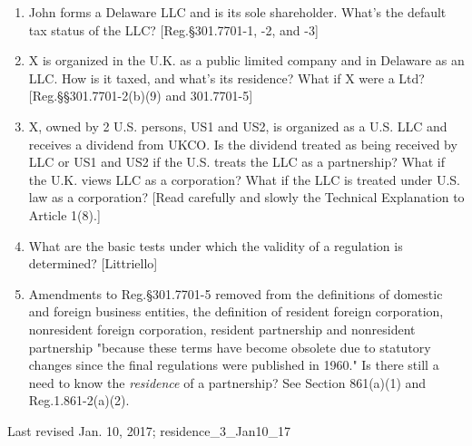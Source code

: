 \begin{enumerate}
	\item John forms a Delaware LLC and is its sole shareholder.  What's the default tax status of the LLC?  [Reg.\@ \S 301.7701-1, -2, and -3]
	
	\item X is organized in the U.K. as a public limited company and in Delaware as an LLC.  How is it taxed, and what's its residence?  What if X were a Ltd? [Reg.\@ \S\S 301.7701-2(b)(9) and 301.7701-5]
	
	\item X, owned by 2 U.S. persons, US1 and US2, is organized as a U.S. LLC and receives a dividend from UKCO.  Is the dividend treated as being received by LLC or US1 and US2 if the U.S. treats the LLC as a partnership?  What if the U.K. views LLC as a corporation?  What if the LLC is treated under U.S. law as a corporation?  [Read carefully and slowly the Technical Explanation to Article 1(8).]                                
	
	\item What are the basic tests under which the validity of a regulation is determined? [Littriello]
		
	\item Amendments to Reg.\@ \S301.7701-5 removed from the definitions of domestic and foreign business entities, the definition of resident foreign corporation, nonresident foreign corporation, resident partnership and nonresident partnership "because these terms have become obsolete due to statutory changes since the final regulations were published in 1960."  Is there still a need to know the \emph{residence} of a partnership?  See Section 861(a)(1) and Reg.\@ 1.861-2(a)(2).

	
\end{enumerate}


\begin{framed}
	Last revised Jan. 10, 2017; residence\_3\_Jan10\_17
	\end{framed}


